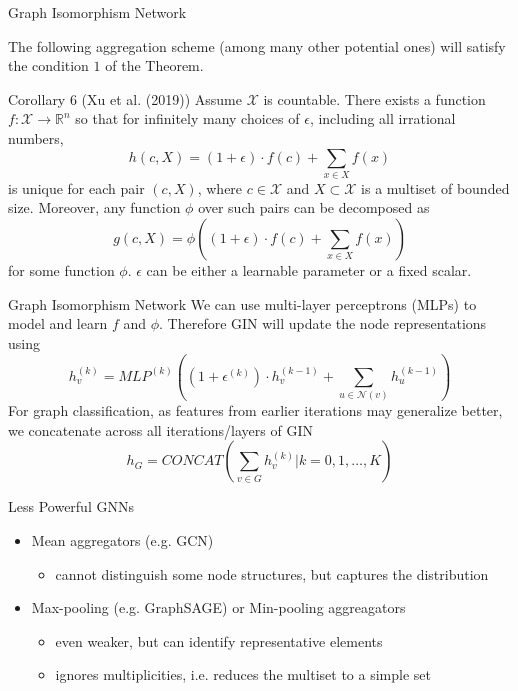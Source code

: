 \documentclass{beamer}
\theoremstyle{definition}
\begin{document}
\begin{frame}{Graph Isomorphism Network}
    \begin{footnotesize}
    The following aggregation scheme (among many other potential ones) will satisfy the condition \(1\) of the Theorem.
    \begin{block}{Corollary 6 (Xu et al. (2019))}
    Assume \(\mathcal{X}\) is countable.  There exists a function \(f:\mathcal{X} \rightarrow \mathbb{R}^n\) so that for infinitely many choices of \(\epsilon\), including all irrational numbers,
    \[
        h(c,X) = (1 + \epsilon) \cdot f(c) + \sum_{x\in X}f(x)
    \]
    is unique for each pair \((c,X)\), where \(c\in\mathcal{X}\) and \(X \subset \mathcal{X}\) is a multiset of bounded size. Moreover, any function \(\phi\) over such pairs can be decomposed as
    \[
        g(c,X) = \phi\left((1 + \epsilon) \cdot f(c) + \sum_{x\in X}f(x)\right)
    \]
    for some function \(\phi\). \(\epsilon\) can be either a learnable parameter or a fixed scalar.
    \end{block}
    \end{footnotesize}
\end{frame}

\begin{frame}{Graph Isomorphism Network}
    We can use multi-layer perceptrons (MLPs) to model and learn \(f\) and \(\phi\). Therefore GIN will update the node representations using
    \[
        h_v^{(k)} = MLP^{(k)}\left(\left(1+\epsilon^{(k)}\right) \cdot h_v^{(k-1)} + \sum_{u\in \mathcal{N}(v)}h_u^{(k-1)}\right)
    \]
    For graph classification, as features from earlier iterations may generalize better, we concatenate across all iterations/layers of GIN
    \[
        h_G = CONCAT\left(\sum_{v\in G}h_v^{(k)} \Big | k = 0, 1, \dots , K\right)
    \]
\end{frame}

\begin{frame}{Less Powerful GNNs}
    \begin{itemize}
        \item Mean aggregators (e.g. GCN)
            \begin{itemize}
                \item cannot distinguish some node structures, but captures the distribution
            \end{itemize}
        \item Max-pooling (e.g. GraphSAGE) or Min-pooling aggreagators
            \begin{itemize}
                \item even weaker, but can identify representative elements
                \item ignores multiplicities, i.e. reduces the multiset to a simple set
            \end{itemize}
    \end{itemize}
\end{frame}
\end{document}
